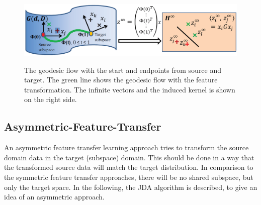 \begin{figure}[t]
	\centering
	\caption[The Process of Geodesic Flow Kernel Approach]{The geodesic flow with the start and endpoints from source and target. The green line shows the geodesic flow with the feature transformation. The infinite vectors and the induced kernel is shown on the right side.\cite{Gong.}}
	\includegraphics[width=\linewidth]{figures/GFKApproach.png}\label{FigGFKApproach}
\end{figure}
\subsection{Asymmetric-Feature-Transfer}\label{TlSubSecHomoAsymFeature}
An asymmetric feature transfer learning approach tries to transform the source domain data in the target (subspace) domain.
This should be done in a way that the transformed source data will match the target distribution.
In comparison to the symmetric feature transfer approaches, there will be no shared subspace, but only the target space.
In the following, the \ac{JDA} algorithm is described, to give an idea of an asymmetric approach.\cite[p. 6; 10]{Weiss.2016}
